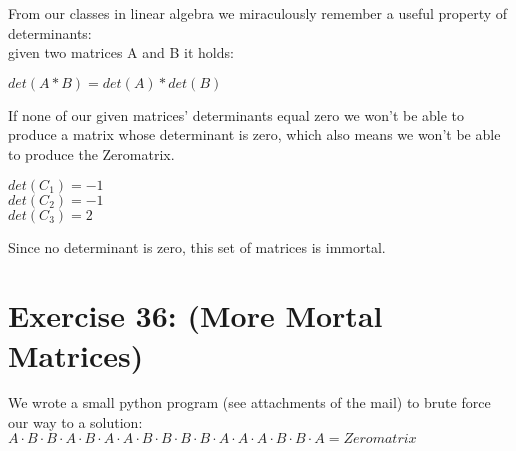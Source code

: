 \documentclass[12pt]{article}
\begin{document}
From our classes in linear algebra we miraculously remember a useful property of determinants:\\
given two matrices A and B it holds: \\
\begin{center}
	$det(A*B) = det(A) * det(B)$
\end{center}
If none of our given matrices' determinants equal zero we won't be able to produce a matrix whose determinant is zero, which also means we won't be able to produce the Zeromatrix.\\
\begin{center}
	$det(C_1) = -1$ \\
	$det(C_2) = -1$ \\
	$det(C_3) = 2$
\end{center}
Since no determinant is zero, this set of matrices is immortal.

\section*{Exercise 36: (More Mortal Matrices)}

We wrote a small python program (see attachments of the mail) to brute force our way to a solution:\\

$A \cdot B \cdot B \cdot A \cdot B \cdot A \cdot A \cdot B \cdot B \cdot B \cdot B \cdot A \cdot A \cdot A \cdot B \cdot B \cdot A = Zeromatrix$


\end{document}

